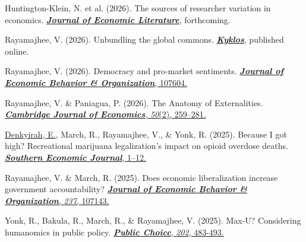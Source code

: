 \documentclass[12pt,letterpaper]{report}
\newcommand{\listitemspace}{0.15em} %
\renewenvironment{itemize}
{\begin{list}{}{\setlength{\leftmargin}{0em}
            \setlength{\parskip}{0em}
            \setlength{\itemsep}{\listitemspace}
            \setlength{\parsep}{\listitemspace}}}
{\end{list}}
\begin{document}

\begin{etaremune} [leftmargin=15 pt, start=30, itemsep=3pt] %


\item Huntington-Klein, N. et al. (2026). The sources of researcher variation in economics. \href{https://dx.doi.org/10.2139/ssrn.5152665}{\textit{\textbf{Journal of Economic Literature}}}, forthcoming.

\item Rayamajhee, V. (2026). Unbundling the global commons. \href{https://doi.org/10.1111/kykl.70075}{\textit{\textbf{Kyklos}}}, published online.

\item Rayamajhee, V. (2026). Democracy and pro-market sentiments. \href{https://doi.org/10.1016/j.jebo.2026.107604}{\textit{\textbf{Journal of Economic Behavior \& Organization}}, 107604.}

\item Rayamajhee, V. \& Paniagua, P. (2026). The Anatomy of Externalities. \href{https://doi.org/10.1093/cje/beag003}{\textit{ \textbf{Cambridge Journal of Economics}}, \textit{50}(2), 259--281.}

\item \underline{Denkyirah, E.}, March, R., Rayamajhee, V., \& Yonk, R. (2025). Because I got high? Recreational marijuana legalization's impact on opioid overdose deaths.
\href{https://doi.org/10.1002/soej.12797} {\textit{\textbf{Southern Economic Journal}}, 1--12.} \\

\item Rayamajhee, V. \& March, R. (2025). Does economic liberalization increase government accountability?   \href{https://doi.org/10.1016/j.jebo.2025.107143} {\textit{\textbf{Journal of Economic Behavior \& Organization}}, \textit{237}, 107143.}

\item Yonk, R., Bakula, R., March, R., \& Rayamajhee, V. (2025). Max-U? Considering humanomics in public policy. \href{https://doi.org/10.1007/s11127-024-01218-5}
{\textit{\textbf{Public Choice}}, \textit{202}, 483-493.}


\end{etaremune}
\end{document}
